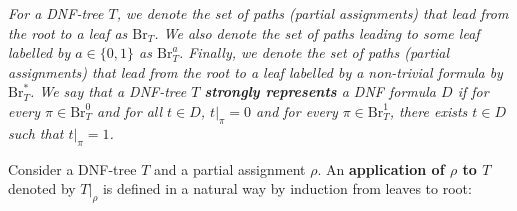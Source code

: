 \documentclass[10pt,a4paper]{article}
\begin{document}
\emph{For a DNF-tree $T$, we denote the set of paths (partial assignments) that lead from the root to a leaf
as $\mathrm{Br}_{T}$. We also denote the set of paths leading to some
leaf labelled by $a\in\{0,1\}$ as $\mathrm{Br}^{a}_{T}$. Finally, we denote the set of paths (partial assignments) that
lead from the root to a leaf labelled by a non-trivial formula by $\mathrm{Br}^{*}_{T}$. We say that a DNF-tree
$T$ \textbf{strongly represents} a DNF formula $D$ if for every $\pi\in\mathrm{Br}^{0}_{T}$ and for all
$t\in D$, $t|_{\pi}=0$ and for every $\pi\in\mathrm{Br}^{1}_{T}$, there exists $t\in D$ such that
$t|_{\pi}=1$.}\par






Consider a DNF-tree $T$ and a partial assignment $\rho$. An \textbf{application of $\rho$ to $T$}
denoted by $T|_{\rho}$ is defined in a natural way by induction from leaves to root:\par
\end{document}
